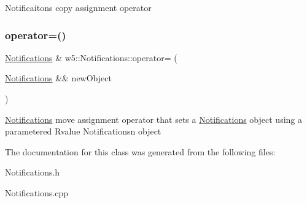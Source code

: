 Notificaitons copy assignment operator \mbox{\label{classw5_1_1Notifications_a5a7b33d61d8ba367018f769975c9a98e}} 
\subsubsection{\texorpdfstring{operator=()}{operator=()}\hspace{0.1cm}{\footnotesize\ttfamily [2/2]}}
{\footnotesize\ttfamily \mbox{\hyperlink{classw5_1_1Notifications}{Notifications}} \& w5\+::\+Notifications\+::operator= (\begin{DoxyParamCaption}\item[{\mbox{\hyperlink{classw5_1_1Notifications}{Notifications}} \&\&}]{new\+Object }\end{DoxyParamCaption})}

\mbox{\hyperlink{classw5_1_1Notifications}{Notifications}} move assignment operator that sets a \mbox{\hyperlink{classw5_1_1Notifications}{Notifications}} object using a parametered Rvalue Notificationsn object 

The documentation for this class was generated from the following files\+:\begin{DoxyCompactItemize}
\item 
Notifications.\+h\item 
Notifications.\+cpp\end{DoxyCompactItemize}
